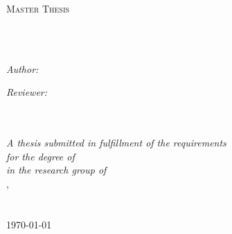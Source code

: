 \documentclass[
	12pt,
	twoside,
	chapterinoneline,
	onehalfspacing, %
	nolistspacing, %
	parskip, %
	headsepline, %
	english,
]{MastersDoctoralThesis} %
\begin{document}
\begin{titlepage}
	\begin{center}
		{\scshape\LARGE \univname\par}\vspace{0.3cm} %
		\textsc{\Large Master Thesis}\\[0.3cm]
		\HRule\\[0.4cm] %
		{\huge \bfseries \ttitle\par}\vspace{0.4cm} %
		\HRule\\[0.5cm] %
		\begin{minipage}[htbp]{0.4\textwidth}
			\begin{flushleft}\large
				\emph{Author:}\\
				\authorname%
			\end{flushleft}
		\end{minipage}
		\hfill
		\begin{minipage}[htbp]{0.5\textwidth}
			\begin{flushright}\large
				\emph{Reviewer:}\\
				\supname\\
				\examname%
			\end{flushright}
		\end{minipage}\\[0.5cm]
		\large \textit{A thesis submitted in fulfillment of
									 the requirements\\ for the degree of
									 \degreename}\\[0.3cm]
		\textit{in the research group of}\\[0.4cm]
		\groupname,\\\deptname\\[0.8cm]
%
%
		\hspace*{0.5cm}
		\\[1.0cm]
%
		{\large \today}
		\vfill
	\end{center}
\end{titlepage}
%
\end{document}
